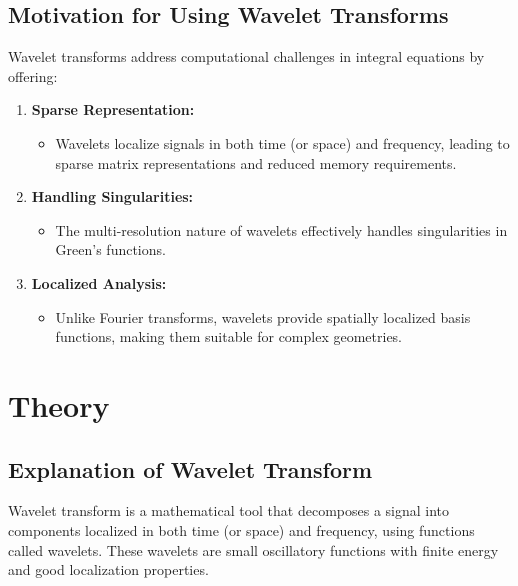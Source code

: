 \documentclass[12pt]{article}
\begin{document}
\subsection{Motivation for Using Wavelet Transforms}
Wavelet transforms address computational challenges in integral equations by offering:
\begin{enumerate}
    \item \textbf{Sparse Representation:}
          \begin{itemize}
              \item Wavelets localize signals in both time (or space) and frequency, leading to sparse matrix representations and reduced memory requirements.
          \end{itemize}
    \item \textbf{Handling Singularities:}
          \begin{itemize}
              \item The multi-resolution nature of wavelets effectively handles singularities in Green’s functions.
          \end{itemize}
    \item \textbf{Localized Analysis:}
          \begin{itemize}
              \item Unlike Fourier transforms, wavelets provide spatially localized basis functions, making them suitable for complex geometries.
          \end{itemize}
\end{enumerate}

\newpage

\section{Theory}

\subsection{Explanation of Wavelet Transform}
Wavelet transform is a mathematical tool that decomposes a signal into components localized in both time (or space) and frequency, using functions called wavelets. These wavelets are small oscillatory functions with finite energy and good localization properties.
\end{document}
